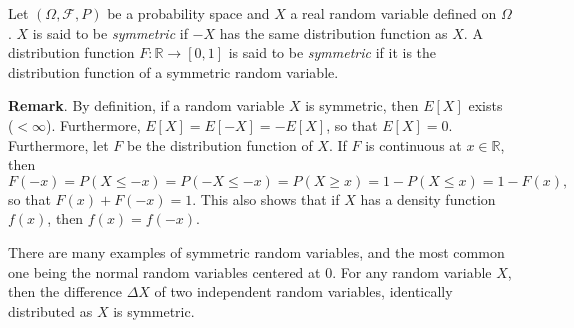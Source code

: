 \documentclass[12pt]{article}
\begin{document}

Let $(\Omega,\mathcal{F},P)$ be a probability space and $X$ a real random variable defined on $\Omega$.  $X$ is said to be \emph{symmetric} if $-X$ has the same distribution function as $X$.  A distribution function $F:\mathbb{R}\to [0,1]$ is said to be \emph{symmetric} if it is the distribution function of a symmetric random variable.

\textbf{Remark}.  By definition, if a random variable $X$ is symmetric, then $E[X]$ exists ($<\infty$).  Furthermore, $E[X]=E[-X]=-E[X]$, so that $E[X]=0$.  Furthermore, let $F$ be the distribution function of $X$.  If $F$ is continuous at $x\in\mathbb{R}$, then $$F(-x)=P(X\le -x)=P(-X\le -x)=P(X\ge x)=1-P(X\le x)=1-F(x),$$ so that $F(x)+F(-x)=1$.  This also shows that if $X$ has a density function $f(x)$, then $f(x)=f(-x)$.

There are many examples of symmetric random variables, and the most common one being the normal random variables centered at $0$.  For any random variable $X$, then the difference $\Delta X$ of two independent random variables, identically distributed as $X$ is symmetric.
\end{document}
